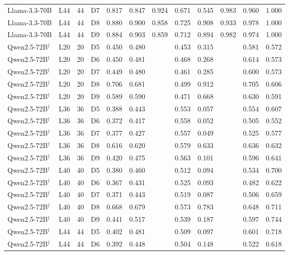 \begin{table}
\begin{tabular}{llrlrrrrrrrr}
Llama-3.3-70B & L44 & 44 & D7 & 0.817 & 0.847 & 0.924 & 0.671 & 0.545 & 0.983 & 0.960 & 1.000 \\
Llama-3.3-70B & L44 & 44 & D8 & 0.880 & 0.900 & 0.858 & 0.725 & 0.908 & 0.933 & 0.978 & 1.000 \\
Llama-3.3-70B & L44 & 44 & D9 & 0.884 & 0.903 & 0.859 & 0.712 & 0.894 & 0.982 & 0.974 & 1.000 \\
Qwen2.5-72B$^\dagger$ & L20 & 20 & D5 & 0.450 & 0.480 &  & 0.453 & 0.315 &  & 0.581 & 0.572 \\
Qwen2.5-72B$^\dagger$ & L20 & 20 & D6 & 0.450 & 0.481 &  & 0.468 & 0.268 &  & 0.614 & 0.573 \\
Qwen2.5-72B$^\dagger$ & L20 & 20 & D7 & 0.449 & 0.480 &  & 0.461 & 0.285 &  & 0.600 & 0.573 \\
Qwen2.5-72B$^\dagger$ & L20 & 20 & D8 & 0.706 & 0.681 &  & 0.499 & 0.912 &  & 0.705 & 0.606 \\
Qwen2.5-72B$^\dagger$ & L20 & 20 & D9 & 0.589 & 0.590 &  & 0.471 & 0.668 &  & 0.630 & 0.591 \\
Qwen2.5-72B$^\dagger$ & L36 & 36 & D5 & 0.388 & 0.443 &  & 0.553 & 0.057 &  & 0.554 & 0.607 \\
Qwen2.5-72B$^\dagger$ & L36 & 36 & D6 & 0.372 & 0.417 &  & 0.558 & 0.052 &  & 0.505 & 0.552 \\
Qwen2.5-72B$^\dagger$ & L36 & 36 & D7 & 0.377 & 0.427 &  & 0.557 & 0.049 &  & 0.525 & 0.577 \\
Qwen2.5-72B$^\dagger$ & L36 & 36 & D8 & 0.616 & 0.620 &  & 0.579 & 0.633 &  & 0.636 & 0.632 \\
Qwen2.5-72B$^\dagger$ & L36 & 36 & D9 & 0.420 & 0.475 &  & 0.563 & 0.101 &  & 0.596 & 0.641 \\
Qwen2.5-72B$^\dagger$ & L40 & 40 & D5 & 0.380 & 0.460 &  & 0.512 & 0.094 &  & 0.534 & 0.700 \\
Qwen2.5-72B$^\dagger$ & L40 & 40 & D6 & 0.367 & 0.431 &  & 0.525 & 0.093 &  & 0.482 & 0.622 \\
Qwen2.5-72B$^\dagger$ & L40 & 40 & D7 & 0.371 & 0.443 &  & 0.519 & 0.087 &  & 0.506 & 0.659 \\
Qwen2.5-72B$^\dagger$ & L40 & 40 & D8 & 0.668 & 0.679 &  & 0.573 & 0.783 &  & 0.648 & 0.711 \\
Qwen2.5-72B$^\dagger$ & L40 & 40 & D9 & 0.441 & 0.517 &  & 0.539 & 0.187 &  & 0.597 & 0.744 \\
Qwen2.5-72B$^\dagger$ & L44 & 44 & D5 & 0.402 & 0.481 &  & 0.509 & 0.097 &  & 0.601 & 0.718 \\
Qwen2.5-72B$^\dagger$ & L44 & 44 & D6 & 0.392 & 0.448 &  & 0.504 & 0.148 &  & 0.522 & 0.618 \\

\end{tabular}
\end{table}
